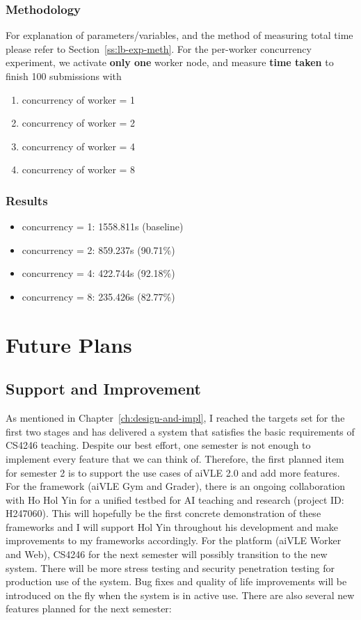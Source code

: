 \documentclass[fyp]{socreport}
\begin{document}
\subsection{Methodology}
For explanation of parameters/variables, and the method of measuring total time please refer to Section~\ref{ss:lb-exp-meth}. For the per-worker concurrency experiment, we activate \textbf{only one} worker node, and measure \textbf{time taken} to finish 100 submissions with
\begin{enumerate}
    \item concurrency of worker = 1
    \item concurrency of worker = 2
    \item concurrency of worker = 4
    \item concurrency of worker = 8
\end{enumerate}

\subsection{Results}

\begin{itemize}
    \item concurrency = 1: 1558.811s (baseline)
    \item concurrency = 2: 859.237s (90.71\%)
    \item concurrency = 4: 422.744s (92.18\%)
    \item concurrency = 8: 235.426s (82.77\%)
\end{itemize}

\chapter{Future Plans}
\label{ch:future-plans}
\section{Support and Improvement}
As mentioned in Chapter~\ref{ch:design-and-impl}, I reached the targets set for the first two stages and has delivered a system that satisfies the basic requirements of CS4246 teaching. Despite our best effort, one semester is not enough to implement every feature that we can think of. Therefore, the first planned item for semester 2 is to support the use cases of aiVLE 2.0 and add more features.
For the framework (aiVLE Gym and Grader), there is an ongoing collaboration with Ho Hol Yin for a unified testbed for AI teaching and research (project ID: H247060). This will hopefully be the first concrete demonstration of these frameworks and I will support Hol Yin throughout his development and make improvements to my frameworks accordingly.
For the platform (aiVLE Worker and Web), CS4246 for the next semester will possibly transition to the new system. There will be more stress testing and security penetration testing for production use of the system. Bug fixes and quality of life improvements will be introduced on the fly when the system is in active use. There are also several new features planned for the next semester:
\end{document}
